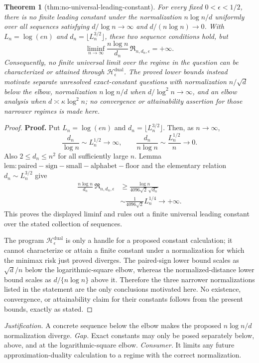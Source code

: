 \documentclass{article}
\newtheorem{theorem}{Theorem}
\begin{document}
\begin{theorem}[thm:no-universal-leading-constant]\label{thm:no-universal-leading-constant}
For every fixed \(0<\epsilon<1/2\), there is no finite leading constant under the normalization \(n\log n/d\) uniformly over all sequences satisfying \(d/\log n\to\infty\) and \(d/(n\log n)\to0\).  With \(L_n=\log(en)\) and \(d_n=\lfloor L_n^{3/2}\rfloor\), these two sequence conditions hold, but
\[
 \liminf_{n\to\infty}
 \frac{n\log n}{d_n}\,
 \mathfrak R_{n,d_n,\epsilon}=+\infty.
\]
Consequently, no finite universal limit over the regime in the question can be characterized or attained through \(\mathscr H_\epsilon^{\mathrm{dual}}\).  The proved lower bounds instead motivate separate unresolved exact-constant questions with normalization \(n/\sqrt d\) below the elbow, normalization \(n\log n/d\) when \(d/\log^2 n\to\infty\), and an elbow analysis when \(d\asymp\kappa\log^2 n\); no convergence or attainability assertion for those narrower regimes is made here.
\end{theorem}
\begin{proof}
\textbf{Proof.}
Put \(L_n=\log(en)\) and \(d_n=\lfloor L_n^{3/2}\rfloor\).  Then, as \(n\to\infty\),
\[
 \frac{d_n}{\log n}\sim L_n^{1/2}\longrightarrow\infty,
 \qquad
 \frac{d_n}{n\log n}\sim\frac{L_n^{1/2}}n\longrightarrow0.
\]
Also \(2\le d_n\le n^2\) for all sufficiently large \(n\).  Lemma \(\mathrm{lem:paired-sign-small-alphabet-floor}\) and the elementary relation \(d_n\sim L_n^{3/2}\) give
\[
 \begin{aligned}
 \frac{n\log n}{d_n}\,
 \mathfrak R_{n,d_n,\epsilon}
 &\ge
 \frac{\log n}{4096\sqrt2\,\sqrt{d_n}}\\
 &\sim\frac{1}{4096\sqrt2}L_n^{1/4}
 \longrightarrow+\infty.
 \end{aligned}
\]
This proves the displayed liminf and rules out a finite universal leading constant over the stated collection of sequences.

The program \(\mathscr H_\epsilon^{\mathrm{dual}}\) is only a handle for a proposed constant calculation; it cannot characterize or attain a finite constant under a normalization for which the minimax risk just proved diverges.  The paired-sign lower bound scales as \(\sqrt d/n\) below the logarithmic-square elbow, whereas the normalized-distance lower bound scales as \(d/\{n\log n\}\) above it.  Therefore the three narrower normalizations listed in the statement are the only conclusions motivated here.  No existence, convergence, or attainability claim for their constants follows from the present bounds, exactly as stated.
\end{proof}
\par\smallskip\noindent \textit{Justification.} A concrete sequence below the elbow makes the proposed \(n\log n/d\) normalization diverge. \textit{Gap.} Exact constants may only be posed separately below, above, and at the logarithmic-square elbow. \textit{Consumer.} It limits any future approximation-duality calculation to a regime with the correct normalization.
\end{document}
